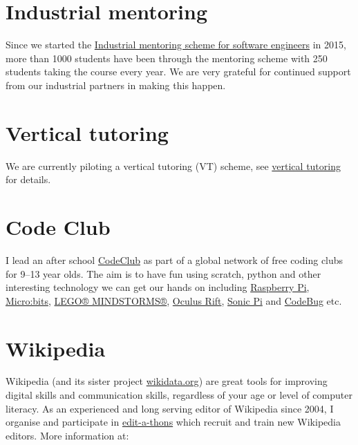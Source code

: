 \documentclass[12pt,]{book}
\begin{document}
\hypertarget{industrial-mentoring}{%
\section{Industrial mentoring}\label{industrial-mentoring}}

Since we started the \href{https://www.cs.manchester.ac.uk/connect/business-engagement/industrial-mentoring/}{Industrial mentoring scheme for software engineers} in 2015, more than 1000 students have been through the mentoring scheme with 250 students taking the course every year. We are very grateful for continued support from our industrial partners in making this happen.

\hypertarget{vertical-tutoring}{%
\section{Vertical tutoring}\label{vertical-tutoring}}

We are currently piloting a vertical tutoring (VT) scheme, see \protect\hyperlink{vertical-tutoring-1}{vertical tutoring} for details.

\hypertarget{codeclub}{%
\section{Code Club}\label{codeclub}}

I lead an after school \href{https://codeclub.org}{CodeClub} as part of a global network of free coding clubs for 9--13 year olds. The aim is to have fun using scratch, python and other interesting technology we can get our hands on including \href{https://www.raspberrypi.org/}{Raspberry Pi}, \href{https://microbit.org/}{Micro:bits}, \href{https://www.lego.com/en-gb/themes/mindstorms}{LEGO® MINDSTORMS®}, \href{https://www.oculus.com}{Oculus Rift}, \href{https://sonic-pi.net/}{Sonic Pi} and \href{http://www.codebug.org.uk/}{CodeBug} etc.

\hypertarget{wikipedia}{%
\section{Wikipedia}\label{wikipedia}}

Wikipedia (and its sister project \href{https://www.wikidata.org}{wikidata.org}) are great tools for improving digital skills and communication skills, regardless of your age or level of computer literacy. As an experienced and long serving editor of Wikipedia since 2004, I organise and participate in \href{https://en.wikipedia.org/wiki/Edit-a-thon}{edit-a-thons} which recruit and train new Wikipedia editors. More information at:
\end{document}
